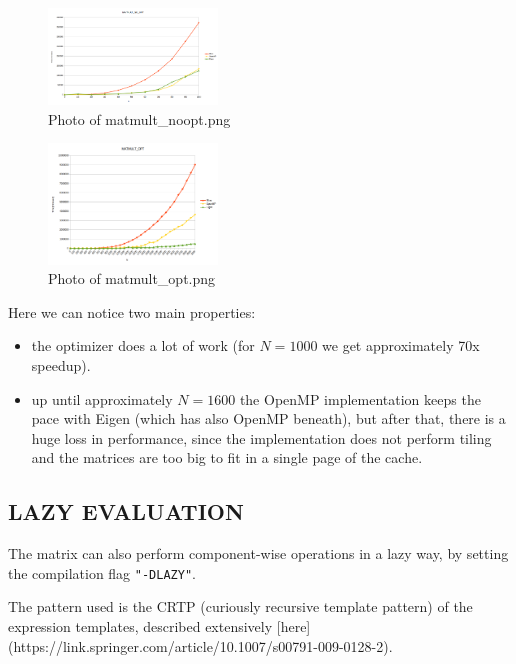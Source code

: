 \documentclass{article}
\begin{document}
\begin{figure}[htbp]
    \centering
    \includegraphics[width=0.4\textwidth]{matmult_noopt.png}
    \caption{Photo of matmult\_noopt.png}
\end{figure}

\begin{figure}[htbp]
    \centering
    \includegraphics[width=0.4\textwidth]{matmult_opt.png}
    \caption{Photo of matmult\_opt.png}
\end{figure}

Here we can notice two main properties:

\begin{itemize}
    \item the optimizer does a lot of work (for \(N=1000\) we get approximately 70x speedup).
    \item up until approximately \(N=1600\) the OpenMP implementation keeps the pace with Eigen (which has also OpenMP beneath), but after that, there is a huge loss in performance, since the implementation does not perform tiling and the matrices are too big to fit in a single page of the cache.
\end{itemize}

\subsection{LAZY EVALUATION}

The matrix can also perform component-wise operations in a lazy way, by setting the compilation flag \texttt{"-DLAZY"}.

The pattern used is the CRTP (curiously recursive template pattern) of the expression templates, described extensively [here](https://link.springer.com/article/10.1007/s00791-009-0128-2).
\end{document}

